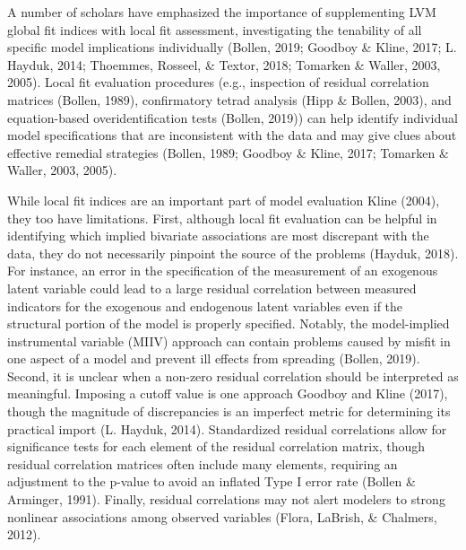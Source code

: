 \documentclass[
  english,
  doc]{apa6}
\begin{document}
A number of scholars have emphasized the importance of supplementing LVM global fit indices with local fit assessment, investigating the tenability of all specific model implications individually (Bollen, 2019; Goodboy \& Kline, 2017; L. Hayduk, 2014; Thoemmes, Rosseel, \& Textor, 2018; Tomarken \& Waller, 2003, 2005). Local fit evaluation procedures (e.g., inspection of residual correlation matrices (Bollen, 1989), confirmatory tetrad analysis (Hipp \& Bollen, 2003), and equation-based overidentification tests (Bollen, 2019)) can help identify individual model specifications that are inconsistent with the data and may give clues about effective remedial strategies (Bollen, 1989; Goodboy \& Kline, 2017; Tomarken \& Waller, 2003, 2005).

While local fit indices are an important part of model evaluation Kline (2004), they too have limitations. First, although local fit evaluation can be helpful in identifying which implied bivariate associations are most discrepant with the data, they do not necessarily pinpoint the source of the problems (Hayduk, 2018). For instance, an error in the specification of the measurement of an exogenous latent variable could lead to a large residual correlation between measured indicators for the exogenous and endogenous latent variables even if the structural portion of the model is properly specified. Notably, the model-implied instrumental variable (MIIV) approach can contain problems caused by misfit in one aspect of a model and prevent ill effects from spreading (Bollen, 2019). Second, it is unclear when a non-zero residual correlation should be interpreted as meaningful. Imposing a cutoff value is one approach Goodboy and Kline (2017), though the magnitude of discrepancies is an imperfect metric for determining its practical import (L. Hayduk, 2014). Standardized residual correlations allow for significance tests for each element of the residual correlation matrix, though residual correlation matrices often include many elements, requiring an adjustment to the p-value to avoid an inflated Type I error rate (Bollen \& Arminger, 1991). Finally, residual correlations may not alert modelers to strong nonlinear associations among observed variables (Flora, LaBrish, \& Chalmers, 2012).
\end{document}
